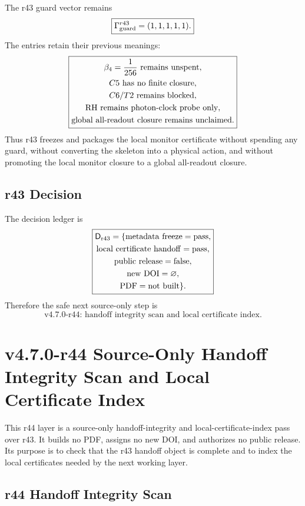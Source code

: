 The r43 guard vector remains
\[
\boxed{
\Gamma_{\rm guard}^{r43}=(1,1,1,1,1).
}
\]
The entries retain their previous meanings:
\[
\boxed{
\begin{gathered}
\beta_4={1\over256}\hbox{ remains unspent},\\
C5\hbox{ has no finite closure},\\
C6/T2\hbox{ remains blocked},\\
\mathrm{RH}\hbox{ remains photon-clock probe only},\\
\hbox{global all-readout closure remains unclaimed}.
\end{gathered}
}
\]
Thus r43 freezes and packages the local monitor certificate without spending any
guard, without converting the skeleton into a physical action, and without
promoting the local monitor closure to a global all-readout closure.

\subsection{r43 Decision}
\label{subsec:r43-decision}

The decision ledger is
\[
\boxed{
\begin{gathered}
\mathsf D_{\rm r43}
=
\{
\mathrm{metadata\ freeze}=\mathrm{pass},\\
\mathrm{local\ certificate\ handoff}=\mathrm{pass},\\
\mathrm{public\ release}=\mathrm{false},\\
\mathrm{new\ DOI}=\varnothing,\\
\mathrm{PDF}=\mathrm{not\ built}
\}.
\end{gathered}
}
\]
Therefore the safe next source-only step is
\[
\boxed{
\text{v4.7.0-r44: handoff integrity scan and local certificate index.}
}
\]



\section{v4.7.0-r44 Source-Only Handoff Integrity Scan and Local Certificate Index}
\label{sec:r44-handoff-integrity-certificate-index}

This r44 layer is a source-only handoff-integrity and local-certificate-index
pass over r43.  It builds no PDF, assigns no new DOI, and authorizes no public
release.  Its purpose is to check that the r43 handoff object is complete and to
index the local certificates needed by the next working layer.

\subsection{r44 Handoff Integrity Scan}
\label{subsec:r44-handoff-integrity-scan}

